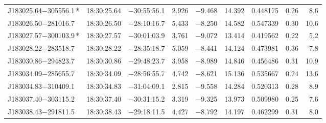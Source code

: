 \begin{table*}
\begin{tabular}{lcccccccr}
J183025.64$-$305556.1\,* & 18:30:25.64 & $-$30:55:56.1 &  2.926 & $-$9.468 & 14.392 & 0.448175 & 0.26 & 8.6 \\
J183026.50$-$281016.7 & 18:30:26.50 & $-$28:10:16.7 &  5.433 & $-$8.250 & 14.582 & 0.547339 & 0.30 & 10.6 \\
J183027.57$-$300103.9\,* & 18:30:27.57 & $-$30:01:03.9 &  3.761 & $-$9.072 & 13.414 & 0.419562 & 0.22 & 5.2 \\
J183028.22$-$283518.7 & 18:30:28.22 & $-$28:35:18.7 &  5.059 & $-$8.441 & 14.124 & 0.473981 & 0.36 & 7.8 \\
J183030.86$-$294823.7 & 18:30:30.86 & $-$29:48:23.7 &  3.958 & $-$8.989 & 14.846 & 0.456486 & 0.31 & 10.9 \\
J183034.09$-$285655.7 & 18:30:34.09 & $-$28:56:55.7 &  4.742 & $-$8.621 & 15.136 & 0.535667 & 0.24 & 13.6 \\
J183034.83$-$310409.1 & 18:30:34.83 & $-$31:04:09.1 &  2.815 & $-$9.558 & 14.284 & 0.520313 & 0.28 & 8.9 \\
J183037.40$-$303115.2 & 18:30:37.40 & $-$30:31:15.2 &  3.319 & $-$9.325 & 13.973 & 0.509980 & 0.25 & 7.6 \\
J183038.43$-$291811.5 & 18:30:38.43 & $-$29:18:11.5 &  4.427 & $-$8.792 & 14.197 & 0.462299 & 0.31 & 8.0 \\
\hline
\end{tabular}
\end{table*}

\addtocounter{table}{-1}

